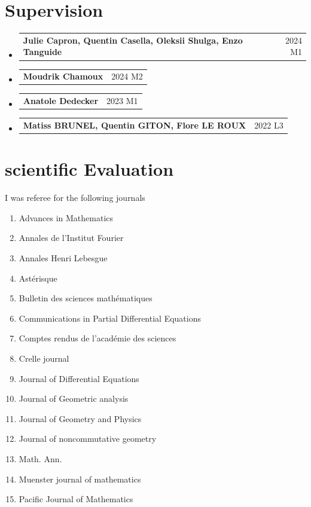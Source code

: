 \documentclass[A4,11pt]{article}
\makeatletter
\newcommand{\CVSubheading}[4]{
  \vspace{-2pt}\item
    \begin{tabular*}{0.97\textwidth}[t]{l@{\extracolsep{\fill}}r}
      \textbf{#1} & #2 \\
      \small#3 & \small #4 \\
    \end{tabular*}\vspace{-7pt}
}
\newcommand{\CVSubheadingshort}[2]{
  \vspace{-2pt}\item
    \begin{tabular*}{0.97\textwidth}[t]{l@{\extracolsep{\fill}}r}
      \textbf{#1} & #2 \\
    \end{tabular*}\vspace{-7pt}
}
\newcommand{\CVSubHeadingListStart}{\begin{itemize}[leftmargin=0.5cm, label={}]}
\newcommand{\CVSubHeadingListEnd}{\end{itemize}}
\makeatother
\begin{document}
  \section{Supervision}
  \CVSubHeadingListStart
\CVSubheadingshort
{Julie Capron, Quentin Casella, Oleksii Shulga, Enzo Tanguide}{2024 M1}
\CVSubheadingshort
{Moudrik Chamoux}{2024 M2}
    \CVSubheadingshort
      {Anatole Dedecker}{2023 M1}
      \CVSubheadingshort
      {Matiss BRUNEL, Quentin GITON, Flore LE ROUX}{2022 L3}

  \CVSubHeadingListEnd
  \section{scientific Evaluation}
  I was referee for the following journals \begin{enumerate}
  \item Advances in Mathematics
  \item Annales de l'Institut Fourier  
  \item Annales Henri Lebesgue
  \item Astérisque
  \item Bulletin des sciences mathématiques
  \item Communications in Partial Differential Equations
  \item Comptes rendus de l'académie des sciences
  \item Crelle journal
  \item Journal of Differential Equations
  \item Journal of Geometric analysis
  \item Journal of Geometry and Physics
  \item Journal of noncommutative geometry
  \item Math. Ann.  
  \item Muenster journal of mathematics
  \item Pacific Journal of Mathematics
  \end{enumerate}
\iffalse
\end{document}
